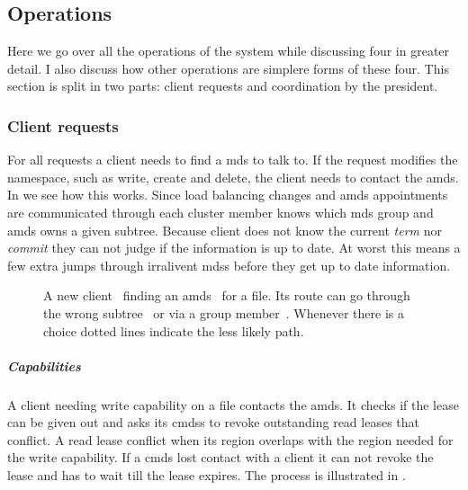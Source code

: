 \subsection{Operations} %
Here we go over all the operations of the system while discussing four in greater detail. I also discuss how other operations are simplere forms of these four. This section is split in two parts: client requests and coordination by the president.
%
\subsubsection*{Client requests}
For all requests a client needs to find a \ac{mds} to talk to. If the request modifies the namespace, such as write, create and delete, the client needs to contact the \ac{amds}. In  we see how this works. Since load balancing changes and \ac{amds} appointments are communicated through \raft{} each cluster member knows which \ac{mds} group and \ac{amds} owns a given subtree. Because client does not know the current \raft{} \textit{term} nor \textit{commit} they can not judge if the information is up to date. At worst this means a few extra jumps through irralivent \acp{mds} before they get up to date information.
%
\begin{figure}[htbp]
	\centering
	
	\caption{A new client~\clientLeg{} finding an \ac{amds}~\amdsLeg{} for a file. Its route can go through the wrong subtree~\umdsLeg{} or via a group member~\cmdsLeg{}. Whenever there is a choice dotted lines indicate the less likely path.}
	\label{fig:find_aMDS}
\end{figure}
%
\subparagraph*{Capabilities} 
A client needing write capability on a file contacts the \ac{amds}. It checks if the lease can be given out and asks its \acp{cmds} to revoke outstanding read leases that conflict. A read lease conflict when its region overlaps with the region needed for the write capability. If a \ac{cmds} lost contact with a client it can not revoke the lease and has to wait till the lease expires. The process is illustrated in . 


